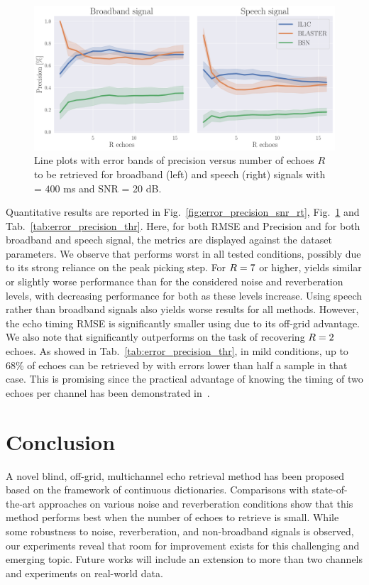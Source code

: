 \begin{figure}[t!]
    \centering
        \includegraphics[width=\linewidth]{figures/blaster/p_k-7_thr-2_bns_crocco_blaster-peak_withRechoes.pdf}
        \caption{\label{fig:error_precision_kecho}  Line plots with error bands of precision versus number of echoes $R$ to be retrieved for broadband (left) and speech (right) signals with \RT{} = $400$ ms and SNR = 20 dB.}
\end{figure}

Quantitative results are reported in Fig.~\ref{fig:error_precision_snr_rt}, Fig.~\ref{fig:error_precision_kecho} and Tab.~\ref{tab:error_precision_thr}.
Here, for both RMSE and Precision and for both broadband and speech signal, the metrics are displayed against the dataset parameters.
We observe that \algoBsn{} performs worst in all tested conditions, possibly due to its strong reliance on the peak picking step.
For $R=7$ or higher, \algoBraire{} yields similar or slightly worse performance than \algoCrocco{} for the considered noise and reverberation levels, with decreasing performance for both as these levels increase.
Using speech rather than broadband signals also yields worse results for all methods.
However, the echo timing RMSE is significantly smaller using \algoBraire{} due to its off-grid advantage. We also note that \algoBraire{} significantly outperforms \algoCrocco{} on the task of recovering $R=2$ echoes. As showed in Tab.~\ref{tab:error_precision_thr}, in mild conditions, up to 68\% of echoes can be retrieved by \algoBraire{} with errors lower than half a sample in that case.
This is promising since the practical advantage of knowing the timing of two echoes per channel has been demonstrated in~.

\section{Conclusion}
A novel blind, off-grid, multichannel echo retrieval method has been proposed based on the framework of continuous dictionaries.
Comparisons with state-of-the-art approaches on various noise and reverberation conditions show that this method performs best when the number of echoes to retrieve is small.
While some robustness to noise, reverberation, and non-broadband signals is observed, our experiments reveal that room for improvement exists for this challenging and emerging topic.
Future works will include an extension to more than two channels and experiments on real-world data.
